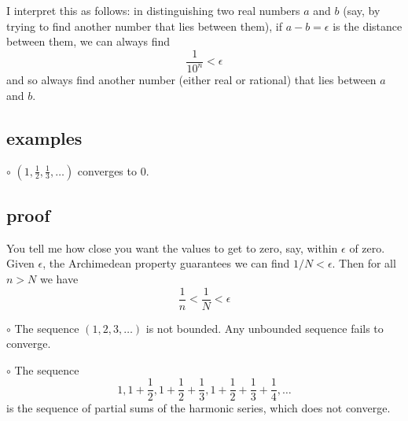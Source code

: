 \documentclass[11pt, oneside]{article}
\begin{document}
I interpret this as follows:  in distinguishing two real numbers $a$ and $b$ (say, by trying to find another number that lies between them), if $a - b = \epsilon$ is the distance between them, we can always find 
\[ \frac{1}{10^n} < \epsilon \]
and so always find another number (either real or rational) that lies between $a$ and $b$.

\subsection*{examples}

$\circ$  $(1, \frac{1}{2}, \frac{1}{3}, \dots)$ converges to $0$.

\subsection*{proof}

You tell me how close you want the values to get to zero, say, within $\epsilon$ of zero.  Given $\epsilon$, the Archimedean property guarantees we can find $1/N < \epsilon$.  Then for all $n > N$ we have
\[ \frac{1}{n} < \frac{1}{N} < \epsilon \]

$\circ$  The sequence $(1, 2, 3, \dots)$ is not bounded.  Any unbounded sequence fails to converge.

$\circ$  The sequence
\[ 1, 1 + \frac{1}{2}, 1 + \frac{1}{2} + \frac{1}{3}, 1 + \frac{1}{2} + \frac{1}{3} +  \frac{1}{4}, \dots \]
is the sequence of partial sums of the harmonic series, which does not converge.
\end{document}
